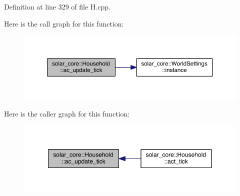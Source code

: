 Definition at line 329 of file H.\+cpp.



Here is the call graph for this function\+:\nopagebreak
\begin{figure}[H]
\begin{center}
\leavevmode
\includegraphics[width=350pt]{classsolar__core_1_1_household_ac73de13d0d4b4e01b2defbb85872c4b2_cgraph}
\end{center}
\end{figure}




Here is the caller graph for this function\+:\nopagebreak
\begin{figure}[H]
\begin{center}
\leavevmode
\includegraphics[width=350pt]{classsolar__core_1_1_household_ac73de13d0d4b4e01b2defbb85872c4b2_icgraph}
\end{center}
\end{figure}


\hypertarget{classsolar__core_1_1_household_a1e7d20a60dc42b8d09a8d23a4cdb26a6}{}

